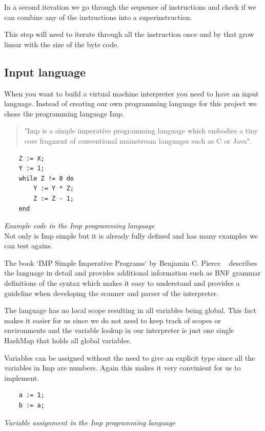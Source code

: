 \documentclass{article}
\begin{document}
In a second iteration we go through the sequence of instructions and check
if we can combine any of the instructions into a superinstruction.

This step will need to iterate through all the instruction once and by that
grow linear with the size of the byte code.

\subsection{Input language} %
\label{sec:input_language}
When you want to build a virtual machine interpreter you need to have an
input language. Instead of creating our own programming language for this
project we chose the programming language Imp. ~\cite{Pierce:SF1}

\begin{quotation}
"Imp is a simple imperative programming language which embodies a tiny core
fragment of conventional mainstream languages such as C or Java". ~\cite{Pierce:SF1}
\end{quotation}

\begin{verbatim}
    Z := X;
    Y := 1;
    while Z != 0 do
        Y := Y * Z;
        Z := Z - 1;
    end
\end{verbatim}
\textit{Example code in the Imp programming language} \\

Not only is Imp simple but it is already fully defined and has many examples
we can test agains.

The book `IMP Simple Imperative Programs` by Benjamin C. Pierce
~\cite{Pierce:SF1} describes the language in detail and provides additional
information such as BNF grammar definitions of the syntax which makes it easy
to understand and provides a guideline when developing the scanner and parser
of the interpreter.

The language has no local scope resulting in all variables being global. This
fact makes it easier for us since we do not need to keep track of scopes or
environments and the variable lookup in our interpreter is just one single
HashMap that holds all global variables.

Variables can be assigned without the need to give an explicit type since all
the variables in Imp are numbers. Again this makes it very convinient for us to
implement.

\begin{verbatim}
    a := 1;
    b := a;
\end{verbatim}
\textit{Variable assignment in the Imp programming language} \\
\end{document}
